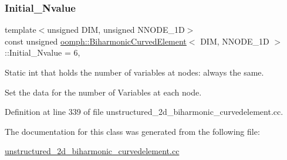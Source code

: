 \subsubsection{\texorpdfstring{Initial\+\_\+\+Nvalue}{Initial\_Nvalue}}
{\footnotesize\ttfamily template$<$unsigned D\+IM, unsigned N\+N\+O\+D\+E\+\_\+1D$>$ \\
const unsigned \hyperlink{classoomph_1_1BiharmonicCurvedElement}{oomph\+::\+Biharmonic\+Curved\+Element}$<$ D\+IM, N\+N\+O\+D\+E\+\_\+1D $>$\+::Initial\+\_\+\+Nvalue = 6\hspace{0.3cm}{\ttfamily [static]}, {\ttfamily [private]}}



Static int that holds the number of variables at nodes\+: always the same. 

Set the data for the number of Variables at each node. 

Definition at line 339 of file unstructured\+\_\+2d\+\_\+biharmonic\+\_\+curvedelement.\+cc.



The documentation for this class was generated from the following file\+:\begin{DoxyCompactItemize}
\item 
\hyperlink{unstructured__2d__biharmonic__curvedelement_8cc}{unstructured\+\_\+2d\+\_\+biharmonic\+\_\+curvedelement.\+cc}\end{DoxyCompactItemize}
